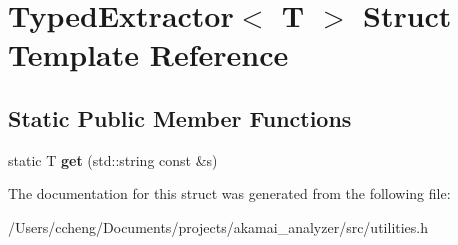 \hypertarget{struct_typed_extractor}{}\section{Typed\+Extractor$<$ T $>$ Struct Template Reference}
\label{struct_typed_extractor}
\subsection*{Static Public Member Functions}
\begin{DoxyCompactItemize}
\item 
\mbox{\label{struct_typed_extractor_a4596766e8d38e7ffa10e98bc112d305b}} 
static T {\bfseries get} (std\+::string const \&s)
\end{DoxyCompactItemize}


The documentation for this struct was generated from the following file\+:\begin{DoxyCompactItemize}
\item 
/\+Users/ccheng/\+Documents/projects/akamai\+\_\+analyzer/src/utilities.\+h\end{DoxyCompactItemize}
